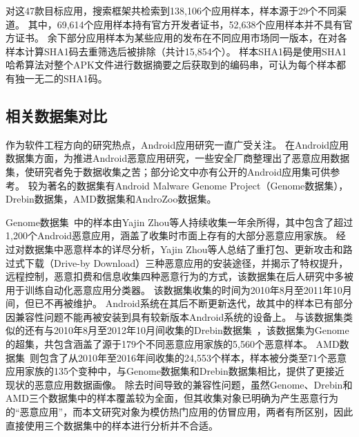 对这47款目标应用，搜索框架共检索到138,106个应用样本，样本源于29个不同渠道。
其中，69,614个应用样本持有官方开发者证书，52,638个应用样本并不具有官方证书。
余下部分应用样本为某些应用的发布在不同应用市场同一版本，在对各样本计算SHA1码去重筛选后被排除（共计15,854个）。
样本SHA1码是使用SHA1哈希算法对整个APK文件进行数据摘要之后获取到的编码串，可认为每个样本都有独一无二的SHA1码。



\subsection{相关数据集对比}

作为软件工程方向的研究热点，Android应用研究一直广受关注。
在Android应用数据集方面，为推进Android恶意应用研究，一些安全厂商整理出了恶意应用数据集，使研究者免于数据收集之苦；部分论文中亦有公开的Android应用集可供参考。
较为著名的数据集有Android Malware Genome Project（Genome数据集），Drebin数据集，AMD数据集和AndroZoo数据集。

Genome数据集~\cite{Zhou2012DissectingAM}中的样本由Yajin Zhou等人持续收集一年余所得，其中包含了超过1,200个Android恶意应用，涵盖了收集时市面上存有的大部分恶意应用家族。
经过对数据集中恶意样本的详尽分析，Yajin Zhou等人总结了重打包、更新攻击和路过式下载（Drive-by Download）三种恶意应用的安装途径，并揭示了特权提升，远程控制，恶意扣费和信息收集四种恶意行为的方式，该数据集在后人研究中多被用于训练自动化恶意应用分类器。
该数据集收集的时间为2010年8月至2011年10月间，但已不再被维护。
Android系统在其后不断更新迭代，故其中的样本已有部分因兼容性问题不能再被安装到具有较新版本Android系统的设备上。
与该数据集类似的还有与2010年8月至2012年10月间收集的Drebin数据集~\cite{arp2014drebin}，该数据集为Genome的超集，共包含涵盖了源于179个不同恶意应用家族的5,560个恶意样本。
AMD数据集~\cite{li2017android}则包含了从2010年至2016年间收集的24,553个样本，样本被分类至71个恶意应用家族的135个变种中，与Genome数据集和Drebin数据集相比，提供了更接近现状的恶意应用数据画像。
除去时间导致的兼容性问题，虽然Genome、Drebin和AMD三个数据集中的样本覆盖较为全面，但其收集对象已明确为产生恶意行为的``恶意应用''，而本文研究对象为模仿热门应用的仿冒应用，两者有所区别，因此直接使用三个数据集中的样本进行分析并不合适。

